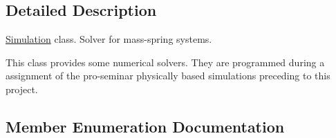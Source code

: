\subsection{Detailed Description}
\hyperlink{classstd_1_1Simulation}{Simulation} class. Solver for mass-\/spring systems.

This class provides some numerical solvers. They are programmed during a assignment of the pro-\/seminar physically based simulations preceding to this project. 

\subsection{Member Enumeration Documentation}
\hypertarget{classstd_1_1Simulation_a7cbc16315b54abab3ee481b83d90bf0f}{}
